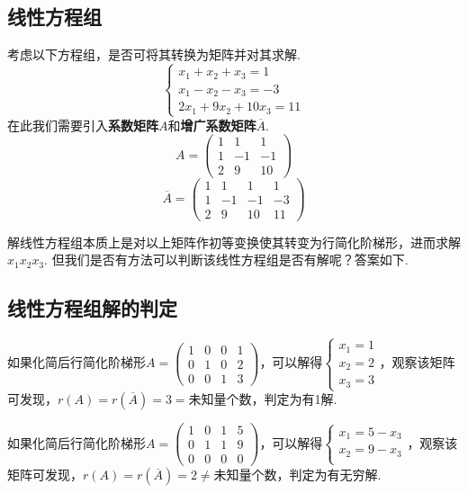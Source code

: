 \documentclass[12pt, a4paper, oneside]{ctexbook}
\begin{document}
\subsection{线性方程组}

考虑以下方程组，是否可将其转换为矩阵并对其求解. 
$$\begin{cases}
    x_1 + x_2 + x_3 = 1 \\
    x_1 - x_2 - x_3 = -3 \\
    2x_1 + 9x_2 + 10x_3 = 11
\end{cases}$$
在此我们需要引入\textbf{系数矩阵}$A$和\textbf{增广系数矩阵}$\overline{A}$.
$$A=\begin{pmatrix}
    1 & 1 & 1 \\
    1 & -1 & -1 \\
    2 & 9 & 10
\end{pmatrix}$$
$$\overline{A}=\left ( \begin{array}{ccc|c}
    1 & 1 & 1 & 1 \\
    1 & -1 & -1 & -3 \\
    2 & 9 & 10 & 11
\end{array} \right )$$

解线性方程组本质上是对以上矩阵作初等变换使其转变为行简化阶梯形，进而求解$x_1 x_2 x_3$. 但我们是否有方法可以判断该线性方程组是否有解呢？答案如下. 

\subsection{线性方程组解的判定}

如果化简后行简化阶梯形$A=\left ( \begin{array}{ccc|c}
    1 & 0 & 0 & 1 \\
    0 & 1 & 0 & 2 \\
    0 & 0 & 1 & 3
\end{array} \right )$，可以解得$\begin{cases}
    x_1 = 1 \\
    x_2 = 2 \\
    x_3 = 3
\end{cases}$，观察该矩阵可发现，$r(A)=r(\overline{A})=3=\mbox{未知量个数}$，判定为有1解. 


如果化简后行简化阶梯形$A=\left ( \begin{array}{ccc|c}
    1 & 0 & 1 & 5 \\
    0 & 1 & 1 & 9 \\
    0 & 0 & 0 & 0
\end{array} \right )$，可以解得$\begin{cases}
    x_1 = 5 - x_3 \\
    x_2 = 9 - x_3 \\
\end{cases}$，观察该矩阵可发现，$r(A)=r(\overline{A})=2 \neq \mbox{未知量个数}$，判定为有无穷解. 
\end{document}
